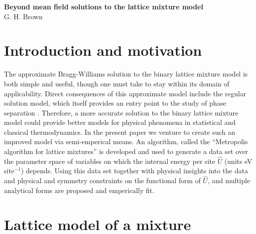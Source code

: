 \documentclass[10pt]{article}
\begin{document}
\begin{center}
    \textbf{\large Beyond mean field solutions to the lattice mixture model} \\
    G. H. Brown
\end{center}


\section{Introduction and motivation}
The approximate Bragg-Williams solution to the binary lattice mixture model is both simple and useful, though one must take to stay within its domain of applicability.
Direct consequences of this approximate model include the regular solution model, which itself provides an entry point to the study of phase separation \cite{dill}.
Therefore, a more accurate solution to the binary lattice mixture model could provide better models for physical phenomena in statistical and classical thermodynamics.
In the present paper we venture to create such an improved model via semi-emperical means.
An algorithm, called the ``Metropolis algorithm for lattice mixtures'' is developed and used to generate a data set over the parameter space of variables on which the internal energy per site $\hat{U}$ (units eV site$^{-1}$) depends.
Using this data set together with physical insights into the data and physical and symmetry constraints on the functional form of $\hat{U}$, and multiple analytical forms are proposed and emperically fit.


\section{Lattice model of a mixture} 
\end{document}
